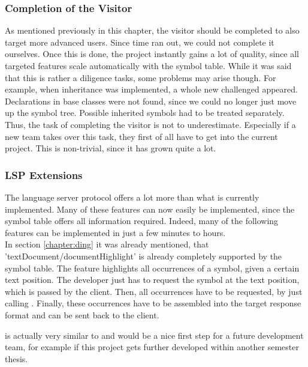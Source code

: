 \subsubsection{Completion of the Visitor}
As mentioned previously in this chapter, the visitor should be completed to also target more advanced users.
Since time ran out, we could not complete it ourselves.
Once this is done, the project instantly gains a lot of quality, since all targeted features scale automatically with the symbol table.
While it was said that this is rather a diligence tasks, some problems may arise though.
For example, when inheritance was implemented, a whole new challenged appeared.
Declarations in base classes were not found, since we could no longer just move up the symbol tree.
Possible inherited symbols had to be treated separately.
Thus, the task of completing the visitor is not to underestimate.
Especially if a new team takes over this task, they first of all have to get into the current project.
This is non-trivial, since it has grown quite a lot.


\subsubsection{LSP Extensions}
The language server protocol \cite{lspspec} offers a lot more than what is currently implemented.
Many of these features can now easily be implemented, since the symbol table offers all information required.
Indeed, many of the following features can be implemented in just a few minutes to hours.\\

In section \ref{chapter:ding} it was already mentioned, that 'textDocument/documentHighlight' \cite{lspspec} is already completely supported by the symbol table.
The feature highlights all occurrences of a symbol, given a certain text position.
The developer just has to request the symbol at the text position, which is passed by the client.
Then, all occurrences have to be requested, by just calling .
Finally, these occurrences have to be assembled into the target response format  and can be sent back to the client.

 is actually very similar to  and would be a nice first step for a future development team,
for example if this project gets further developed within another semester thesis.\\

